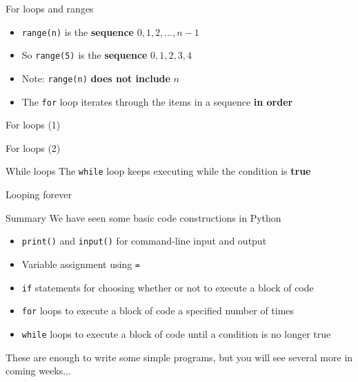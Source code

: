 \begin{frame}{For loops and ranges}

\begin{itemize}
\item \lstinline{range(n)} is the \textbf{sequence}
$0, 1, 2, \dots, n-1$
\item So \lstinline{range(5)} is the \textbf{sequence}
$0, 1, 2, 3, 4$
\item Note: \lstinline{range(n)} \textbf{does not include} $n$
\item The \lstinline{for} loop iterates through the items in a sequence \textbf{in order}
\end{itemize}
\end{frame}

\begin{frame}{For loops (1)}
\end{frame}

\begin{frame}{For loops (2)}
\end{frame}

\begin{frame}{While loops}
The \lstinline{while} loop keeps executing while the condition is \textbf{true}

\end{frame}

\begin{frame}{Looping forever}

\end{frame}

\begin{frame}{Summary}
 We have seen some basic code constructions in Python
\begin{itemize}
\item \lstinline{print()} and \lstinline{input()} for command-line input and output
\item Variable assignment using \lstinline{=}
\item \lstinline{if} statements for choosing whether or not to execute a block of code
\item \lstinline{for} loops to execute a block of code a specified number of times
\item \lstinline{while} loops to execute a block of code until a condition is no longer true
\end{itemize}
 These are enough to write some simple programs, but you will see several more in coming weeks...
\end{frame}

